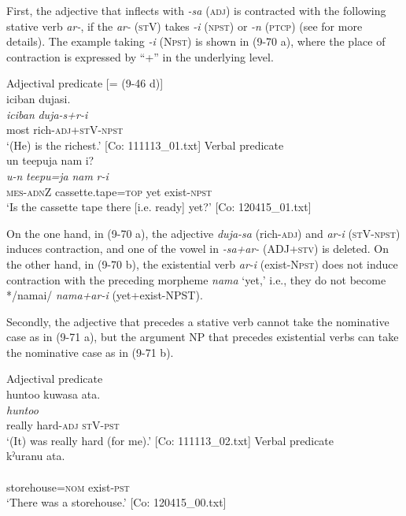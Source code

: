 First, the adjective that inflects with \textit{{}-sa} (\textsc{adj}) is contracted with the following stative verb \textit{ar-}, if the \textit{ar-} (\textsc{st}V) takes \textit{{}-i} (\textsc{npst}) or \textit{-n} (\textsc{ptcp}) (see  for more details). The example taking \textit{{}-i} (N\textsc{pst}) is shown in (9-70 a), where the place of contraction is expressed by “+” in the underlying level.

\ea   \label{ex:9.70}
\ea Adjectival predicate [= (9-46 d)]\\
    \glll  {\textbar}iciban{\textbar}  dujasi.\\
      \textit{iciban}  \textit{duja-s+r-i}\\
      most  rich-\textsc{adj}+\textsc{st}V-\textsc{npst}\\
      \glt       ‘(He) is the richest.’ [Co: 111113\_01.txt]
\ex Verbal predicate\\
    \glll  un  {\textbar}teepu{\textbar}ja  nam  i?\\
      \textit{u-n}  \textit{teepu=ja}  \textit{nam}  \textit{r-i}\\
      \textsc{mes}-\textsc{adn}Z  cassette.tape=\textsc{top}  yet  exist-\textsc{npst}\\
      \glt       ‘Is the cassette tape there [i.e. ready] yet?’ [Co: 120415\_01.txt]
    \z
\z

On the one hand, in (9-70 a), the adjective \textit{duja-sa} (rich-\textsc{adj}) and \textit{ar-i} (\textsc{st}V-\textsc{npst}) induces contraction, and one of the vowel in \textit{{}-sa+ar-} (ADJ+\textsc{stv}) is deleted. On the other hand, in (9-70 b), the existential verb \textit{ar-i} (exist-N\textsc{pst}) does not induce contraction with the preceding morpheme \textit{nama} ‘yet,’ i.e., they do not become */namai/ \textit{nama+ar-i} (yet+exist-NPST).

Secondly, the adjective that precedes a stative verb cannot take the nominative case as in (9-71 a), but the argument NP that precedes existential verbs can take the nominative case as in (9-71 b).

\ea    \label{ex:9.71}
 \ea Adjectival predicate\\
    \glll  huntoo  kuwasa  ata.\\
      \textit{huntoo}  \textit{}  \textit{}\\
      really  hard-\textsc{adj}  \textsc{st}V-\textsc{pst}\\
      \glt       ‘(It) was really hard (for me).’ [Co: 111113\_02.txt]
 \ex Verbal predicate\\
    \glll  kˀuranu  ata.\\
      \textit{}  \textit{}\\
      storehouse=\textsc{nom}  exist-\textsc{pst}\\
      \glt       ‘There was a storehouse.’ [Co: 120415\_00.txt]
    \z
\z

